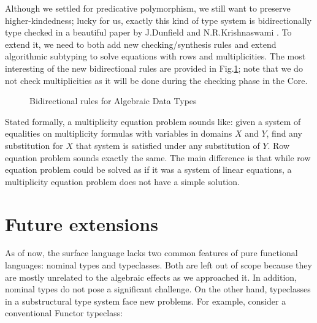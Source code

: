 \documentclass[a4paper,14pt]{extreport}
\begin{document}
Although we settled for predicative polymorphism, we still want to preserve
higher-kindedness; lucky for us, exactly this kind of type system is
bidirectionally type checked in a beautiful paper by J.Dunfield and
N.R.Krishnaswami \cite{bidir-impl}. To extend it, we need to both add new
checking/synthesis rules and extend algorithmic subtyping to solve equations
with rows and multiplicities. The most interesting of the new bidirectional
rules are provided in Fig.\ref{bidir-rules}; note that we do not check
multiplicities as it will be done during the checking phase in the Core.

\begin{figure}
    \centering
    \caption{Bidirectional rules for Algebraic Data Types}
    \label{bidir-rules}
\end{figure}

Stated formally, a multiplicity equation problem sounds like: given a system of
equalities on multiplicity formulas with variables in domains $X$ and $Y$, find
any substitution for $X$ that system is satisfied under any substitution of $Y$.
Row equation problem sounds exactly the same. The main difference is that while
row equation problem could be solved as if it was a system of linear equations,
a multiplicity equation problem does not have a simple solution.

\section{Future extensions}

As of now, the surface language lacks two common features of pure functional
languages: nominal types and typeclasses. Both are left out of scope because
they are mostly unrelated to the algebraic effects as we approached it. In
addition, nominal types do not pose a significant challenge. On the other hand,
typeclasses in a substructural type system face new problems. For example,
consider a conventional Functor typeclass:
\end{document}
